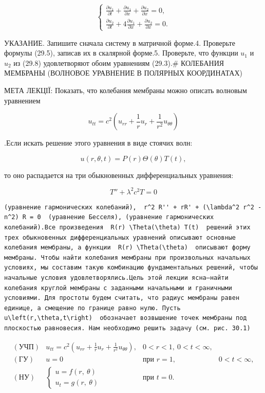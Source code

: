 \documentclass[
  ukrainian,
]{article}
\begin{document}
\[
\begin{cases} \frac{\partial u_1}{\partial t} + \frac{\partial u_1}{\partial x} + \frac{\partial u_2}{\partial x} = 0, \\ \frac{\partial u_2}{\partial t} + 4 \frac{\partial u_1}{\partial x} + \frac{\partial u_2}{\partial x} = 0. \end{cases}
\]

УКАЗАНИЕ. Запишите сначала систему в матричной форме.4. Проверьте
формулы (29.5), записав их в скалярной форме.5. Проверьте, что функции
\(u_1\) и \(u_2\) из (29.8) удовлетворяют обоим уравнениям (29.3).\#
КОЛЕБАНИЯ МЕМБРАНЫ (ВОЛНОВОЕ УРАВНЕНИЕ В ПОЛЯРНЫХ КООРДИНАТАХ)

МЕТА ЛЕКЦІЇ: Показать, что колебания мембраны можно описать волновым
уравнением

\[
u_{tt} = c^2 \left( u_{rr} + \frac{1}{r} u_r + \frac{1}{r^2} u_{\theta\theta} \right)
\]

.Если искать решение этого уравнения в виде стоячих волн:

\[
u(r, \theta, t) = P(r) \Theta(\theta) T(t),
\]

то оно распадается на три обыкновенных дифференциальных уравнения:

\[
T'' + \lambda^2 c^2 T = 0
\]

\begin{verbatim}
(уравнение гармонических колебаний),  r^2 R'' + rR' + (\lambda^2 r^2 - n^2) R = 0  (уравнение Бесселя), (уравнение гармонических колебаний).Все произведения  R(r) \Theta(\theta) T(t)  решений этих трех обыкновенных дифференциальных уравнений описывают основные колебания мембраны, а функции  R(r) \Theta(\theta)  описывают форму мембраны. Чтобы найти колебания мембраны при произвольных начальных условиях, мы составим такую комбинацию фундаментальных решений, чтобы начальные условия удовлетворялись.Цель этой лекции ясна—найти колебания круглой мембраны с заданными начальными и граничными условиями. Для простоты будем считать, что радиус мембраны равен единице, а смещение по границе равно нулю. Пусть  u\left(r,\theta,t\right)  обозначает возвышение точек мембраны под плоскостью равновесия. Нам необходимо решить задачу (см. рис. 30.1)
\end{verbatim}

\[
\begin{array}{lll} (\text{УЧП}) & u_{tt} = c^2 \left( u_{rr} + \frac{1}{r} u_r + \frac{1}{r^2} u_{\theta\theta} \right), & 0 < r < 1, \ 0 < t < \infty, \\ (\text{ГУ}) & u = 0 & \text{при } r = 1, & 0 < t < \infty, \\ (\text{НУ}) & \begin{cases} u = f(r, \ \theta) \\ u_t = g(r, \ \theta) \end{cases} & \text{при } t = 0. \end{array}
\]
\end{document}
